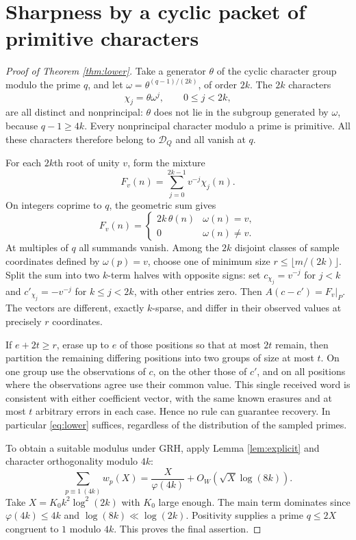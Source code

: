 \documentclass[11pt]{article}
\theoremstyle{remark}\newtheorem{remark}[theorem]{Remark}
\newcommand{\D}{\mathcal D}
\begin{document}
\section{Sharpness by a cyclic packet of primitive characters}
\begin{proof}[Proof of Theorem \ref{thm:lower}]
Take a generator $\theta$ of the cyclic character group modulo the prime $q$, and let $\omega=\theta^{(q-1)/(2k)}$, of order $2k$. The $2k$ characters
\[
 \chi_j=\theta\omega^j,\qquad 0\le j<2k,
\]
are all distinct and nonprincipal: $\theta$ does not lie in the subgroup generated by $\omega$, because $q-1\ge4k$. Every nonprincipal character modulo a prime is primitive. All these characters therefore belong to $\D_Q$ and all vanish at $q$.

For each $2k$th root of unity $v$, form the mixture
\[
 F_v(n)=\sum_{j=0}^{2k-1} v^{-j}\chi_j(n).
\]
On integers coprime to $q$, the geometric sum gives
\begin{equation}\label{eq:comb}
 F_v(n)=\begin{cases}2k\,\theta(n)&\omega(n)=v,\\0&\omega(n)\ne v.\end{cases}
\end{equation}
At multiples of $q$ all summands vanish. Among the $2k$ disjoint classes of sample coordinates defined by $\omega(p)=v$, choose one of minimum size $r\le\lfloor m/(2k)\rfloor$. Split the sum into two $k$-term halves with opposite signs: set $c_{\chi_j}=v^{-j}$ for $j<k$ and $c'_{\chi_j}=-v^{-j}$ for $k\le j<2k$, with other entries zero. Then $A(c-c')=F_v|_P$. The vectors are different, exactly $k$-sparse, and differ in their observed values at precisely $r$ coordinates.

If $e+2t\ge r$, erase up to $e$ of those positions so that at most $2t$ remain, then partition the remaining differing positions into two groups of size at most $t$. On one group use the observations of $c$, on the other those of $c'$, and on all positions where the observations agree use their common value. This single received word is consistent with either coefficient vector, with the same known erasures and at most $t$ arbitrary errors in each case. Hence no rule can guarantee recovery. In particular \eqref{eq:lower} suffices, regardless of the distribution of the sampled primes.

To obtain a suitable modulus under GRH, apply Lemma \ref{lem:explicit} and character orthogonality modulo $4k$:
\[
 \sum_{p\equiv1\ (4k)}w_p(X)=\frac{X}{\varphi(4k)}+O_W(\sqrt X\log(8k)).
\]
Take $X=K_0 k^2\log^2(2k)$ with $K_0$ large enough. The main term dominates since $\varphi(4k)\le4k$ and $\log(8k)\ll\log(2k)$. Positivity supplies a prime $q\le2X$ congruent to $1$ modulo $4k$. This proves the final assertion.
\end{proof}
\end{document}
